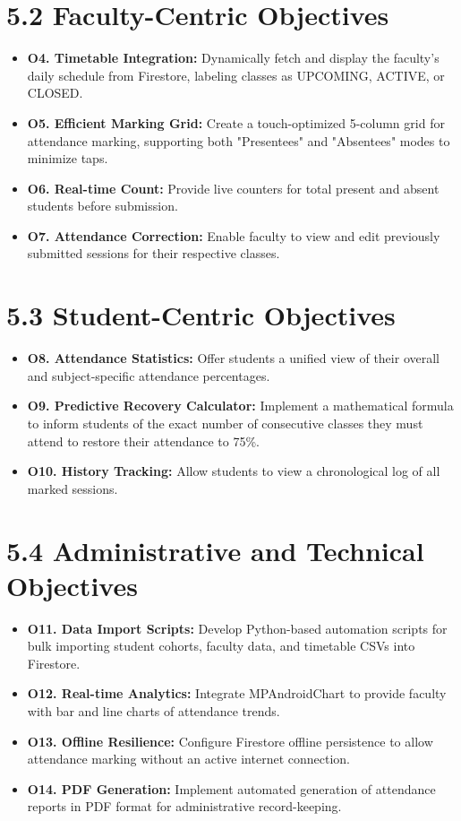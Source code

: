\documentclass[12pt,a4paper]{report}
\begin{document}
\section*{5.2 Faculty-Centric Objectives}
\begin{itemize}[leftmargin=*, label=\checkmark]
    \item \textbf{O4. Timetable Integration:} Dynamically fetch and display the faculty's daily schedule from Firestore, labeling classes as UPCOMING, ACTIVE, or CLOSED.
    \item \textbf{O5. Efficient Marking Grid:} Create a touch-optimized 5-column grid for attendance marking, supporting both "Presentees" and "Absentees" modes to minimize taps.
    \item \textbf{O6. Real-time Count:} Provide live counters for total present and absent students before submission.
    \item \textbf{O7. Attendance Correction:} Enable faculty to view and edit previously submitted sessions for their respective classes.
\end{itemize}

\section*{5.3 Student-Centric Objectives}
\begin{itemize}[leftmargin=*, label=\checkmark]
    \item \textbf{O8. Attendance Statistics:} Offer students a unified view of their overall and subject-specific attendance percentages.
    \item \textbf{O9. Predictive Recovery Calculator:} Implement a mathematical formula to inform students of the exact number of consecutive classes they must attend to restore their attendance to 75\%.
    \item \textbf{O10. History Tracking:} Allow students to view a chronological log of all marked sessions.
\end{itemize}

\section*{5.4 Administrative and Technical Objectives}
\begin{itemize}[leftmargin=*, label=\checkmark]
    \item \textbf{O11. Data Import Scripts:} Develop Python-based automation scripts for bulk importing student cohorts, faculty data, and timetable CSVs into Firestore.
    \item \textbf{O12. Real-time Analytics:} Integrate MPAndroidChart to provide faculty with bar and line charts of attendance trends.
    \item \textbf{O13. Offline Resilience:} Configure Firestore offline persistence to allow attendance marking without an active internet connection.
    \item \textbf{O14. PDF Generation:} Implement automated generation of attendance reports in PDF format for administrative record-keeping.
\end{itemize}
\end{document}
